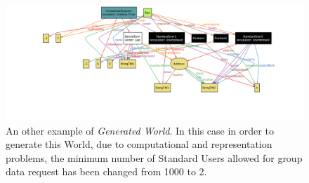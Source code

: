  \begin{figure}[H]
 \begin{center}
   \includegraphics[width=0.80\paperwidth]{./img/alloy/alloy6.png}
   \hspace{0.05\linewidth}
   \centering
   \caption{An other example of \textit{Generated World}. In this case in order to generate this World, due to computational and representation problems, the minimum number of Standard Users allowed for group data request has been changed from 1000 to 2.}
   \label{img:generatedWorld}
 \end{center}
 \end{figure}


\vspace{1cm}

